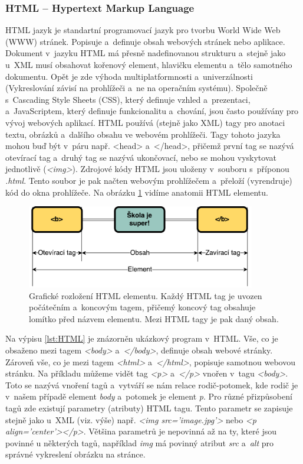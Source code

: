\subsubsection{HTML – Hypertext Markup Language}
\label{sec:HTML}

HTML jazyk je standartní programovací jazyk pro tvorbu World Wide Web (WWW) stránek. Popisuje a~definuje obsah webových stránek nebo aplikace. Dokument v~jazyku HTML má přesně nadefinovanou strukturu a~stejně jako u~XML musí obsahovat kořenový element, hlavičku elementu a~tělo samotného dokumentu. Opět je zde výhoda multiplatformnosti a~univerzálnosti (Vykreslování závisí na prohlížeči a~ne na operačním systému). Společně s~Cascading Style Sheets (CSS), který definuje vzhled a~prezentaci, a~JavaScriptem, který definuje funkcionalitu a~chování, jsou často používány pro vývoj webových aplikací. HTML používá (stejně jako XML) tagy pro anotaci textu, obrázků a~dalšího obsahu ve webovém prohlížeči. Tagy tohoto jazyka mohou buď být v~páru např. <head> a~</head>, přičemž první tag se nazývá otevírací tag a~druhý tag se nazývá ukončovací, nebo se mohou vyskytovat jednotlivě (\textit{<img>}). Zdrojové kódy HTML jsou uloženy v~souboru s~příponou \textit{.html}. Tento soubor je pak načten webovým prohlížečem a~přeloží (vyrendruje) kód do okna prohlížeče. Na obrázku \ref{fig:HTMLElement} vidíme anatomii HTML elementu.

\begin{figure} [H]
	\centering
	\includegraphics[width=10cm]{../HTMLElement.pdf}
	\caption{Grafické rozložení HTML elementu. Každý HTML tag je uvozen počátečním a~koncovým tagem, přičemý koncový tag obsahuje lomítko před názvem elementu. Mezi HTML tagy je pak daný obsah.}
	\label{fig:HTMLElement}
\end{figure}

Na výpisu \ref{lst:HTML} je znázorněn ukázkový program v~HTML. Vše, co je obsaženo mezi tagem \textit{<body>} a~\textit{</body>}, definuje obsah webové stránky. Zároveň vše, co je mezi tagem \textit{<html>} a~\textit{</html>}, popisuje samotnou webovou stránku. Na příkladu můžeme vidět tag \textit{<p>} a~\textit{</p>} vnořen v~tagu \textit{<body>}. Toto se nazývá vnoření tagů a~vytváří se nám relace rodič-potomek, kde rodič je v~našem případě element \textit{body} a~potomek je element \textit{p}. 
Pro různé přizpůsobení tagů zde existují parametry (atributy) HTML tagu. Tento parametr se zapisuje stejně jako u~XML (viz. výše) např. \textit{<img src='image.jpg'>} nebo \textit{<p align='center'></p>}. Většina parametrů je nepovinná až na ty, které jsou povinné u některých tagů, například \textit{img} má povinný atribut \textit{src} a~\textit{alt} pro správné vykreslení obrázku na stránce.


